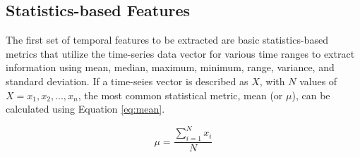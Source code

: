 \subsection{Statistics-based Features}
\label{sec:statisticsfeatures}

The first set of temporal features to be extracted are basic statistics-based metrics that utilize the time-series data vector for various time ranges to extract information using mean, median, maximum, minimum, range, variance, and standard deviation. If a time-seies vector is described as $X$, with $N$ values of $X = {x_1, x_2,...,x_n}$, the most common statistical metric, mean (or $\mu$), can be calculated using Equation \ref{eq:mean}.

\begin{equation}
\mu = \frac{\sum\limits_{i=1}^N x_i}{N}
\label{eq:mean}
\end{equation}
